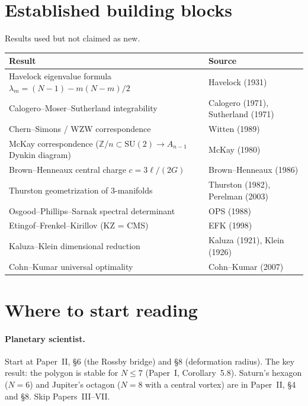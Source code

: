 \section{Established building blocks}

Results used but not claimed as new.

\medskip
\begin{tabular}{p{6.5cm}p{6.5cm}}
\toprule
Result & Source \\
\midrule
Havelock eigenvalue formula $\lambda_m = (N{-}1) - m(N{-}m)/2$ &
  Havelock (1931) \\[3pt]
Calogero--Moser--Sutherland integrability &
  Calogero (1971), Sutherland (1971) \\[3pt]
Chern--Simons / WZW correspondence &
  Witten (1989) \\[3pt]
McKay correspondence ($\mathbb{Z}/n \subset \mathrm{SU}(2)
  \to A_{n-1}$ Dynkin diagram) &
  McKay (1980) \\[3pt]
Brown--Henneaux central charge $c = 3\ell/(2G)$ &
  Brown--Henneaux (1986) \\[3pt]
Thurston geometrization of 3-manifolds &
  Thurston (1982), Perelman (2003) \\[3pt]
Osgood--Phillips--Sarnak spectral determinant &
  OPS (1988) \\[3pt]
Etingof--Frenkel--Kirillov (KZ = CMS) &
  EFK (1998) \\[3pt]
Kaluza--Klein dimensional reduction &
  Kaluza (1921), Klein (1926) \\[3pt]
Cohn--Kumar universal optimality &
  Cohn--Kumar (2007) \\[3pt]
\bottomrule
\end{tabular}

\section{Where to start reading}

\paragraph{Planetary scientist.}
Start at Paper~II, \S6 (the Rossby bridge) and \S8
(deformation radius).
The key result: the polygon is stable for $N \le 7$
(Paper~I, Corollary~5.8).
Saturn's hexagon ($N = 6$) and Jupiter's octagon ($N = 8$
with a central vortex) are in Paper~II, \S4 and \S8.
Skip Papers~III--VII.

